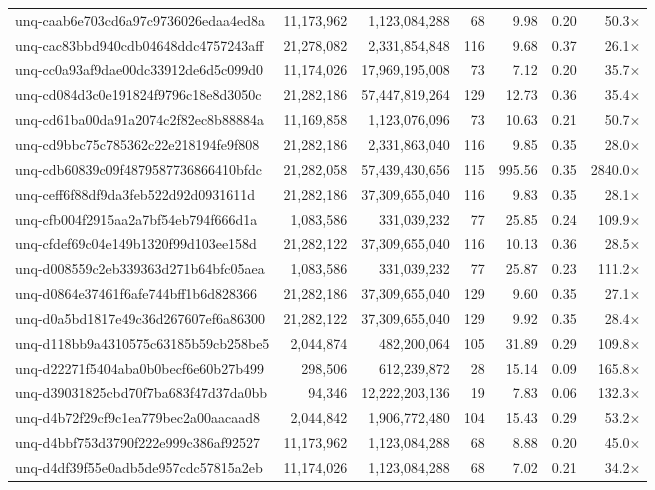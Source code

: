 \begin{table}[h!]
\begin{tabular}{lrrrrrr}
unq-caab6e703cd6a97c9736026edaa4ed8a & 11,173,962 & 1,123,084,288 & 68 & 9.98 & 0.20 & 50.3$\times$ \\
unq-cac83bbd940cdb04648ddc4757243aff & 21,278,082 & 2,331,854,848 & 116 & 9.68 & 0.37 & 26.1$\times$ \\
unq-cc0a93af9dae00dc33912de6d5c099d0 & 11,174,026 & 17,969,195,008 & 73 & 7.12 & 0.20 & 35.7$\times$ \\
unq-cd084d3c0e191824f9796c18e8d3050c & 21,282,186 & 57,447,819,264 & 129 & 12.73 & 0.36 & 35.4$\times$ \\
unq-cd61ba00da91a2074c2f82ec8b88884a & 11,169,858 & 1,123,076,096 & 73 & 10.63 & 0.21 & 50.7$\times$ \\
unq-cd9bbc75c785362c22e218194fe9f808 & 21,282,186 & 2,331,863,040 & 116 & 9.85 & 0.35 & 28.0$\times$ \\
unq-cdb60839c09f4879587736866410bfdc & 21,282,058 & 57,439,430,656 & 115 & 995.56 & 0.35 & 2840.0$\times$ \\
unq-ceff6f88df9da3feb522d92d0931611d & 21,282,186 & 37,309,655,040 & 116 & 9.83 & 0.35 & 28.1$\times$ \\
unq-cfb004f2915aa2a7bf54eb794f666d1a & 1,083,586 & 331,039,232 & 77 & 25.85 & 0.24 & 109.9$\times$ \\
unq-cfdef69c04e149b1320f99d103ee158d & 21,282,122 & 37,309,655,040 & 116 & 10.13 & 0.36 & 28.5$\times$ \\
unq-d008559c2eb339363d271b64bfc05aea & 1,083,586 & 331,039,232 & 77 & 25.87 & 0.23 & 111.2$\times$ \\
unq-d0864e37461f6afe744bff1b6d828366 & 21,282,186 & 37,309,655,040 & 129 & 9.60 & 0.35 & 27.1$\times$ \\
unq-d0a5bd1817e49c36d267607ef6a86300 & 21,282,122 & 37,309,655,040 & 129 & 9.92 & 0.35 & 28.4$\times$ \\
unq-d118bb9a4310575c63185b59cb258be5 & 2,044,874 & 482,200,064 & 105 & 31.89 & 0.29 & 109.8$\times$ \\
unq-d22271f5404aba0b0becf6e60b27b499 & 298,506 & 612,239,872 & 28 & 15.14 & 0.09 & 165.8$\times$ \\
unq-d39031825cbd70f7ba683f47d37da0bb & 94,346 & 12,222,203,136 & 19 & 7.83 & 0.06 & 132.3$\times$ \\
unq-d4b72f29cf9c1ea779bec2a00aacaad8 & 2,044,842 & 1,906,772,480 & 104 & 15.43 & 0.29 & 53.2$\times$ \\
unq-d4bbf753d3790f222e999c386af92527 & 11,173,962 & 1,123,084,288 & 68 & 8.88 & 0.20 & 45.0$\times$ \\
unq-d4df39f55e0adb5de957cdc57815a2eb & 11,174,026 & 1,123,084,288 & 68 & 7.02 & 0.21 & 34.2$\times$ \\

\end{tabular}
\end{table}

